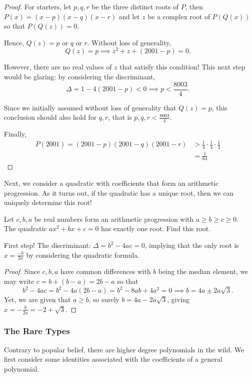 \documentclass[../main.tex]{subfiles}
\begin{document}
\begin{proof}
    For starters, let $p,q,r$ be the three distinct roots of $P$, then $P(x)=(x-p)(x-q)(x-r)$ and let $z$ be a complex root of $P(Q(x))$ so that $P(Q(z))=0$. 

Hence, $Q(z)=\text{$p$ or $q$ or $r$}$. Without loss of generality, $$Q(z)=p \implies z^2+z+(2001-p)=0.$$

However, there are no real values of $z$ that satisfy this condition! This next step would be glaring: by considering the discriminant,
$$\Delta=1-4(2001-p) < 0 \implies p < \frac{8003}{4}.$$

Since we initially assumed without loss of generality that $Q(z)=p$, this conclusion should also hold for $q, r$, that is $p,q,r < \frac{8003}{4}$.

Finally, \begin{align*}
    P(2001)=(2001-p)(2001-q)(2001-r) &> \frac{1}{4}\cdot\frac{1}{4}\cdot\frac{1}{4} \\
    &=\frac{1}{64}
\end{align*}
\end{proof}
Next, we consider a quadratic with coefficients that form an arithmetic progression. As it turns out, if the quadratic has a unique root, then we can uniquely determine this root!
\begin{example}[2013 AMC 10B P19]
    Let $c,b,a$ be real numbers form an arithmetic progression with $a\geq b\geq c\geq 0$. The quadratic $ax^2+bx+c=0$ has exactly one root. Find this root.
\end{example}
First step! The discriminant: $\Delta=b^2-4ac=0$, implying that the only root is $x=\frac{-b}{2a}$ by considering the quadratic formula.

\begin{proof}
    Since $c,b,a$ have common differences with $b$ being the median element, we may write $c=b+(b-a)=2b-a$ so that 
$$b^2-4ac=b^2-4a(2b-a)=b^2-8ab+4a^2=0 \implies b=4a\pm2a\sqrt{3}.$$
Yet, we are given that $a\geq b$, so surely $b=4a-2a\sqrt{3}$, giving $x=-\frac{b}{2a}=\boxed{-2+\sqrt{3}}.$
\end{proof}

\subsubsection{The Rare Types}
Contrary to popular belief, there are higher degree polynomials in the wild. We first consider some identities associated with the coefficients of a general polynomial.
\end{document}
